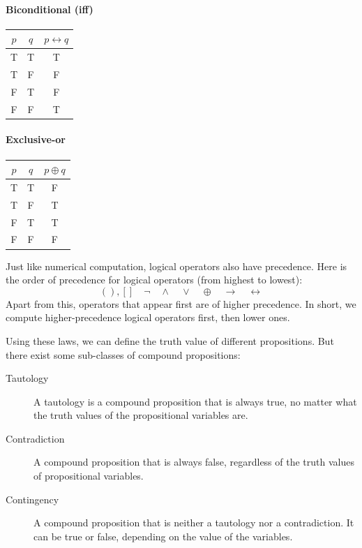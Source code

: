 \paragraph{Biconditional (iff)}
\begin{center}
\begin{tabular}{cc|c}
\toprule
$p$ & $q$ & $p \leftrightarrow q$ \\
\midrule
T & T & T \\
T & F & F \\
F & T & F \\
F & F & T \\
\bottomrule
\end{tabular}
\end{center}

\paragraph{Exclusive-or}
\begin{center}
\begin{tabular}{cc|c}
\toprule
$p$ & $q$ & $p \oplus q$ \\
\midrule
T & T & F \\
T & F & T \\
F & T & T \\
F & F & F \\
\bottomrule
\end{tabular}
\end{center}

Just like numerical computation, logical operators also have precedence. Here is the order of precedence for logical operators (from highest to lowest):
$$ ( ), [ ] \quad \neg \quad \wedge \quad \vee \quad \oplus \quad \to \quad \leftrightarrow $$
Apart from this, operators that appear first are of higher precedence. In short, we compute higher-precedence logical operators first, then lower ones.

Using these laws, we can define the truth value of different propositions. But there exist some sub-classes of compound propositions:
\begin{description}
    \item[Tautology] A tautology is a compound proposition that is always true, no matter what the truth values of the propositional variables are.
    \item[Contradiction] A compound proposition that is always false, regardless of the truth values of propositional variables.
    \item[Contingency] A compound proposition that is neither a tautology nor a contradiction. It can be true or false, depending on the value of the variables.
\end{description}

